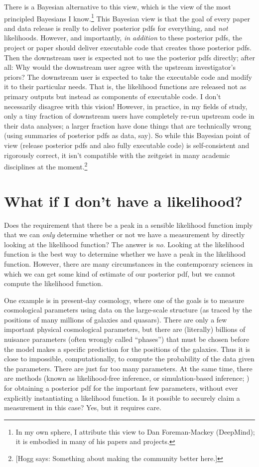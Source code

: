 \documentclass{article}
\newcommand{\hogg}[1]{{\color{blue}[Hogg says: {#1}]}}
\begin{document}
There is a Bayesian alternative to this view, which is the view of the most principled Bayesians I know.\footnote{In my own sphere, I attribute this view to Dan Foreman-Mackey (DeepMind); it is embodied in many of his papers and projects.}
This Bayesian view is that the goal of every paper and data release is really to deliver posterior pdfs for everything, and \emph{not} likelihoods.
However, and importantly, \emph{in addition} to these posterior pdfs, the project or paper should deliver executable code that creates those posterior pdfs.
Then the downstream user is expected not to use the posterior pdfs directly; after all:
Why would the downstream user agree with the upstream investigator's priors?
The downstream user is expected to take the executable code and modify it to their particular needs.
That is, the likelihood functions are released not as primary outputs but instead as components of executable code.
I don't necessarily disagree with this vision!
However, in practice, in my fields of study, only a tiny fraction of downstream users have completely re-run upstream code in their data analyses; a larger fraction have done things that are technically wrong (using summaries of posterior pdfs as data, say).
So while this Bayesian point of view (release posterior pdfs and also fully executable code) is self-consistent and rigorously correct, it isn't compatible with the zeitgeist in many academic disciplines at the moment.\footnote{\hogg{Something about making the community better here.}}

\section{What if I don't have a likelihood?}\label{sec:lfi}
Does the requirement that there be a peak in a sensible likelihood function imply that we can \emph{only} determine whether or not we have a measurement by directly looking at the likelihood function?
The answer is \emph{no}.
Looking at the likelihood function is the best way to determine whether we have a peak in the likelihood function.
However, there are many circumstances in the contemporary sciences in which we can get some kind of estimate of our posterior pdf, but we cannot compute the likelihood function.

One example is in present-day cosmology, where one of the goals is to measure cosmological parameters using data on the large-scale structure (as traced by the positions of many millions of galaxies and quasars).
There are only a few important physical cosmological parameters, but there are (literally) billions of nuisance parameters (often wrongly called ``phases'') that must be chosen before the model makes a specific prediction for the positions of the galaxies.
Thus it is close to impossible, computationally, to compute the probability of the data given the parameters.
There are just far too many parameters.
At the same time, there are methods (known as likelihood-free inference, or simulation-based inference; \cite{abc, sbi}) for obtaining a posterior pdf for the important few parameters, without ever explicitly instantiating a likelihood function.
Is it possible to securely claim a measurement in this case?
Yes, but it requires care.
\end{document}
